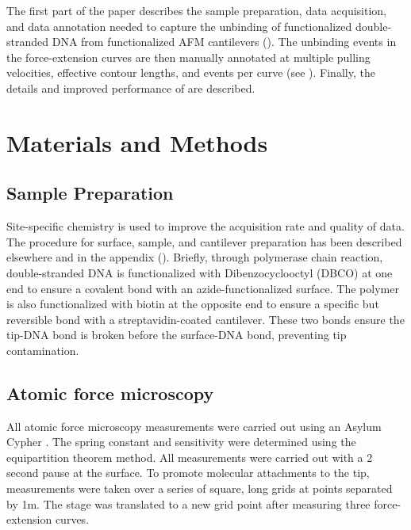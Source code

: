  The first part of the paper describes the sample preparation, data acquisition, and data annotation needed to capture the unbinding of functionalized double-stranded DNA from functionalized AFM cantilevers ().  The unbinding events in the force-extension curves are then manually annotated at multiple pulling velocities, effective contour lengths, and events per curve (see ). Finally, the details and improved performance of \name{} are described. 

\chapter{Materials and Methods}

\section{Sample Preparation}

Site-specific chemistry is used to improve the acquisition rate and quality of data. The procedure for surface, sample, and cantilever preparation has been described elsewhere\cite{walder_robert_rapid_nodate} and in the appendix (). Briefly, through polymerase chain reaction, double-stranded DNA is functionalized with Dibenzocyclooctyl (DBCO) at one end to ensure a covalent bond with an azide-functionalized surface. The polymer is also functionalized with biotin at the opposite end to ensure a specific but reversible bond with a streptavidin-coated cantilever. These two bonds ensure the tip-DNA bond is broken before the surface-DNA bond, preventing tip contamination. 

\section{Atomic force microscopy}

All atomic force microscopy measurements were carried out using an Asylum Cypher . The spring constant and sensitivity were determined using the equipartition theorem method. All measurements were carried out with a 2 second pause at the surface. To promote molecular attachments to the tip, measurements were taken over a series of square,  long grids at points separated by 1\textmu{}m. The stage was translated to a new grid point after measuring three force-extension curves. 

